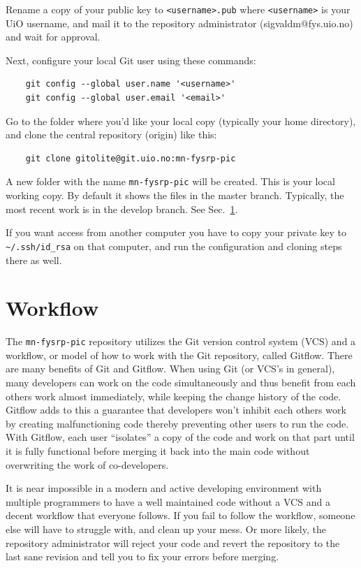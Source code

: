 \documentclass[10pt,a4paper]{article}
\newcommand{\mnfysrppic}{\texttt{mn-fysrp-pic}}
\newcommand{\refsec}[1]{Sec.~\ref{sec:#1}}
\begin{document}
Rename a copy of your public key to \verb$<username>.pub$ where \verb$<username>$ is your UiO username, and mail it to the repository administrator (sigvaldm@fys.uio.no) and wait for approval.

Next, configure your local Git user using these commands:

\begin{verbatim}
	git config --global user.name '<username>'
	git config --global user.email '<email>'
\end{verbatim}
Go to the folder where you'd like your local copy (typically your home directory), and clone the central repository (origin) like this:

\begin{verbatim}
	git clone gitolite@git.uio.no:mn-fysrp-pic
\end{verbatim}
A new folder with the name \verb$mn-fysrp-pic$ will be created. This is your local working copy. By default it shows the files in the master branch. Typically, the most recent work is in the develop branch. See \refsec{workflow}.

If you want access from another computer you have to copy your private key to \verb$~/.ssh/id_rsa$ on that computer, and run the configuration and cloning steps there as well. 

\section{Workflow}\label{sec:workflow}
The \mnfysrppic{} repository utilizes the Git version control system (VCS) and a workflow, or model of how to work with the Git repository, called Gitflow. There are many benefits of Git and Gitflow. When using Git (or VCS's in general), many developers can work on the code simultaneously and thus benefit from each others work almost immediately, while keeping the change history of the code. Gitflow adds to this a guarantee that developers won't inhibit each others work by creating malfunctioning code thereby preventing other users to run the code. With Gitflow, each user ``isolates'' a copy of the code and work on that part until it is fully functional before merging it back into the main code without overwriting the work of co-developers.

It is near impossible in a modern and active developing environment with multiple programmers to have a well maintained code without a VCS and a decent workflow that everyone follows. If you fail to follow the workflow, someone else will have to struggle with, and clean up your mess. Or more likely, the repository administrator will reject your code and revert the repository to the last sane revision and tell you to fix your errors before merging.
\end{document}
